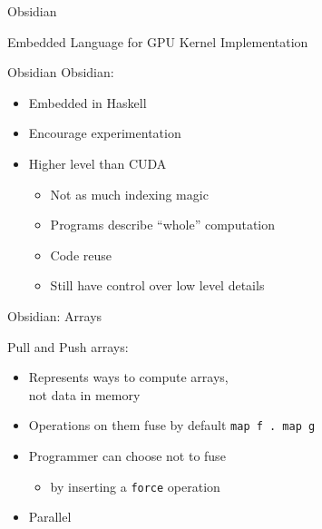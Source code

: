 \documentclass[xcolor=dvipsnames]{beamer}
\begin{document}
%



\begin{frame}{Obsidian} 
  
  \begin{center}
  {\Large Embedded Language for GPU Kernel Implementation}
  \end{center}
      
\end{frame} 

%

\begin{frame}{Obsidian} 
  Obsidian: 
  \begin{itemize} 
    \item Embedded in Haskell
    \item Encourage experimentation
    \item Higher level than CUDA 
      \begin{itemize} 
        \item Not as much indexing magic
        \item Programs describe ``whole'' computation
        \item Code reuse 
        \item Still have control over low level details
      \end{itemize} 
  \end{itemize}  
\end{frame}

\begin{frame}[fragile]{Obsidian: Arrays}
  
  Pull and Push arrays: 
  \begin{itemize}
  \item Represents ways to compute arrays, \\
        not data in memory
  \item Operations on them fuse by default \newline
    \verb!map f . map g!
  \item Programmer can choose not to fuse
    \begin{itemize} 
    \item by inserting a {\tt force} operation
    \end{itemize}
  \item Parallel
  \end{itemize} 
     
\end{frame} 
\end{document}
